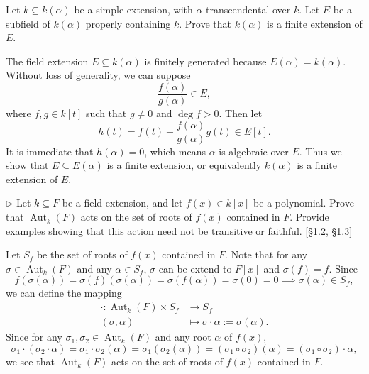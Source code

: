 \documentclass[12pt,letterpaper,boxed]{hmcpset}
\begin{document}
\begin{problem}[1.4]
Let $k \subseteq k(\alpha)$ be a simple extension, with $\alpha$ transcendental over $k$. Let $E$ be a subfield of $k(\alpha)$ properly containing $k$. Prove that $k(\alpha)$ is a finite extension of $E$.
\end{problem}
\begin{solution}
The field extension $E\subseteq k(\alpha)$ is finitely generated because  $E(\alpha)= k(\alpha)$. Without loss of generality, we can suppose 
\[
\frac{f(\alpha)}{g(\alpha)}\in E,
\]
where $f,g\in k[t]$ such that $g\ne0$ and $\deg f>0$. Then let
\[
h(t)=f(t)-\frac{f(\alpha)}{g(\alpha)}g(t)\in E[t].
\]
It is immediate that $h(\alpha)=0$, which means $\alpha$ is algebraic over $E$. Thus we show that $E\subseteq E(\alpha)$ is a finite extension, or equivalently $k(\alpha)$ is a finite extension of $E$.
\end{solution}

\begin{problem}[1.6]
$\triangleright$ Let $k \subseteq F$ be a field extension, and let $f(x) \in k[x]$ be a polynomial. Prove that $\operatorname{Aut}_{k}(F)$ acts on the set of roots of $f(x)$ contained in $F$. Provide examples showing that this action need not be transitive or faithful. [\S1.2, \S1.3]
\end{problem}
\begin{solution}
Let $S_f$ be the set of roots of $f(x)$ contained in $F$. Note that for any $\sigma\in\operatorname{Aut}_{k}(F)$ and any $\alpha\in S_f$, $\sigma$ can be extend to $F[x]$ and $\sigma(f)=f$. Since
\[
f(\sigma(\alpha))=\sigma(f)(\sigma(\alpha))=\sigma(f(\alpha))=\sigma(0)=0\implies\sigma(\alpha)\in S_f,
\]
we can define the mapping
\begin{align*}
	\cdot:\operatorname{Aut}_{k}(F)\times S_f &\longrightarrow S_f\\
	(\sigma, \alpha) &\longmapsto  \sigma\cdot\alpha:=\sigma(\alpha).
\end{align*}
Since for any $\sigma_1,\sigma_2\in\operatorname{Aut}_{k}(F)$ and any root $\alpha$ of $f(x)$,
\[
\sigma_1\cdot(\sigma_2\cdot\alpha)=\sigma_1\cdot\sigma_2(\alpha)=\sigma_1(\sigma_2(\alpha))=(\sigma_1\circ\sigma_2)(\alpha)=(\sigma_1\circ\sigma_2)\cdot\alpha,
\]
we see that $\operatorname{Aut}_{k}(F)$ acts on the set of roots of $f(x)$ contained in $F$.
\end{solution}


\newpage
\end{document}
